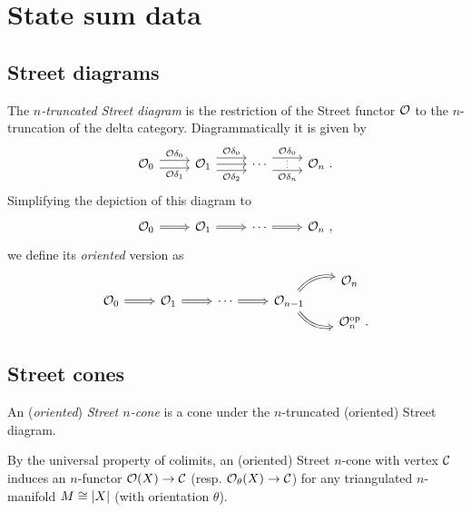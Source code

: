 
\section{State sum data}

\subsection{Street diagrams}

The \textit{$n$-truncated Street diagram} is the restriction of the Street functor $\mathcal{O}$ to the $n$-truncation of the delta category.
Diagrammatically it is given by
\[
\begin{tikzcd}
	\oriental_0
	\arrow[r,shift left=3pt, "\oriental{\delta_0}"] \arrow[r,shift right=3pt, "\oriental{\delta_1}"'] & \oriental_1
	\arrow[r,shift left=5pt, "\oriental{\delta_0}"] \arrow[r,shift right=5pt, "\oriental{\delta_2}"'] \rar &
	\dotsb
	\arrow[r,shift left=5pt, "\oriental{\delta_0}"] \arrow[r,shift right=5pt, "\oriental{\delta_n}"', "\scalebox{0.6}{$\vdots$}"] &
	\oriental_{n} \ .
\end{tikzcd}
\]
Simplifying the depiction of this diagram to
\[
\begin{tikzcd}
	\oriental_0
	\arrow[r, Rightarrow] & \oriental_1
	\arrow[r, Rightarrow] & \dotsb
	\arrow[r, Rightarrow] & \oriental_n \ ,
\end{tikzcd}
\]
we define its \textit{oriented} version as
\[
\begin{tikzcd}[column sep=normal, row sep=0]
	& & & &[-5pt] \oriental_n \ \ \\
	\oriental_0
	\arrow[r, Rightarrow] & \oriental_1
	\arrow[r, Rightarrow] & \dotsb
	\arrow[r, Rightarrow] & \oriental_{n-1}
	\arrow[ur, Rightarrow, bend left] \arrow[dr, Rightarrow, bend right] & \\
	& & & & \oriental_n^\op \ .
\end{tikzcd}
\]

\subsection{Street cones}

An (\textit{oriented}) \textit{Street $n$-cone} is a cone under the $n$-truncated (oriented) Street diagram.

By the universal property of colimits, an (oriented) Street $n$-cone with vertex $\mathcal{C}$ induces an $n$-functor $\mathcal{O}(X) \to \mathcal{C}$ (resp. $\mathcal{O}_\theta(X) \to \mathcal{C}$) for any triangulated $n$-manifold $M \cong \lvert X\rvert$ (with orientation $\theta$).

